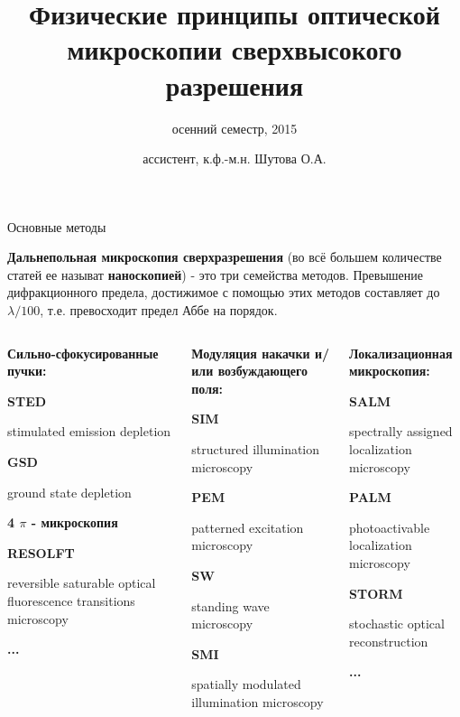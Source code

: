 \documentclass[9pt, compress, xcolor=table]{beamer}
\title{Физические принципы оптической микроскопии сверхвысокого разрешения}
\subtitle{осенний семестр, 2015}
\author{ассистент, к.ф.-м.н. Шутова О.А.}
\institute{МГУ им. М.В. Ломоносова, физический факультет}
\begin{document}
\maketitle


\begin{frame}{Основные методы}

\textcolor{red!50!black}{\textbf{Дальнепольная микроскопия сверхразрешения}} (во всё большем количестве статей ее называт \textcolor{red!50!black}{\textbf{наноскопией}}) - это три семейства методов. Превышение дифракционного предела, достижимое с помощью этих методов составляет до \textcolor{red!50!black}{\textbf{$\lambda/100$}}, т.е. превосходит предел Аббе на порядок.
\begin{columns}[c]
\column{4cm}
\begin{center}
\textcolor{red!50!black}{\textbf{Сильно-сфокусированные пучки:}}

\textbf{STED} 

{\small stimulated emission depletion} 

\textbf{GSD} 

{\small ground state depletion}

\textbf{4 $\pi$ - микроскопия}

\textbf{RESOLFT}

{\small reversible saturable optical fluorescence transitions microscopy}

\textbf{...}
\end{center}
\column{4cm}
\begin{center}
\textcolor{red!50!black}{\textbf{Модуляция накачки и/или возбуждающего поля:}}

\textbf{SIM}  

{\small structured illumination microscopy}

\textbf{PEM}

{\small patterned excitation microscopy}

\textbf{SW}

{\small standing wave microscopy}

\textbf{SMI}  

{\small spatially modulated illumination microscopy}
\end{center}
\column{4cm}
\begin{center}
\textcolor{red!50!black}{\textbf{Локализационная микроскопия:}}

\textbf{SALM} 

{\small spectrally assigned localization microscopy}

\textbf{PALM}

{\small photoactivable localization microscopy}

\textbf{STORM}

{\small stochastic optical reconstruction}

\textbf{...}
\end{center}

\end{columns}

\end{frame}
\end{document}
